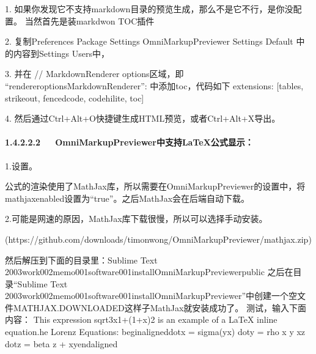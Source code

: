 \documentclass[letterpaper,12pt,english]{sphinxmanual}
\begin{document}
\begin{sphinxVerbatim}[commandchars=\\\{\}]
1. 如果你发现它不支持markdown目录的预览生成，那么不是它不行，是你没配置。
   当然首先是装markdwon TOC插件

2. 复制Preferences \PYGZhy{}\PYGZgt{} Package Settings \PYGZhy{}\PYGZgt{} OmniMarkupPreviewer \PYGZhy{}\PYGZgt{} Settings \PYGZhy{} Default 中的内容到Settings \PYGZhy{} Users中，

3. 并在 // MarkdownRenderer options区域，即
“renderer\PYGZus{}options\PYGZhy{}MarkdownRenderer”: 中添加\PYGZdq{}toc\PYGZdq{}，代码如下
        \PYGZdq{}extensions\PYGZdq{}: [\PYGZdq{}tables\PYGZdq{}, \PYGZdq{}strikeout\PYGZdq{}, \PYGZdq{}fenced\PYGZus{}code\PYGZdq{}, \PYGZdq{}codehilite\PYGZdq{}, \PYGZdq{}toc\PYGZdq{}]

4. 然后通过Ctrl+Alt+O快捷键生成HTML预览，或者Ctrl+Alt+X导出。
\end{sphinxVerbatim}


\paragraph{1.4.2.2.2   OmniMarkupPreviewer中支持LaTeX公式显示：}
\label{\detokenize{001software/001install/sublime:omnimarkuppreviewerlatex}}
1.设置。

\begin{sphinxVerbatim}[commandchars=\\\{\}]
公式的渲染使用了MathJax库，所以需要在OmniMarkupPreviewer的设置中，将\PYGZdq{}mathjax\PYGZus{}enabled\PYGZdq{}设置为“true”。之后MathJax会在后端自动下载。
\end{sphinxVerbatim}

2.可能是网速的原因，MathJax库下载很慢，所以可以选择手动安装。

\begin{sphinxVerbatim}[commandchars=\\\{\}]
[下载MathJax](https://github.com/downloads/timonwong/OmniMarkupPreviewer/mathjax.zip)

    然后解压到下面的目录里：Sublime Text 2\PYGZbs{}\PYGZbs{}003work\PYGZbs{}002memo\PYGZbs{}001software\PYGZbs{}001install\PYGZbs{}OmniMarkupPreviewer\PYGZbs{}public
    之后在目录“Sublime Text 2\PYGZbs{}\PYGZbs{}003work\PYGZbs{}002memo\PYGZbs{}001software\PYGZbs{}001install\PYGZbs{}OmniMarkupPreviewer”中创建一个空文件MATHJAX.DOWNLOADED这样子MathJax就安装成功了。
    测试，输入下面内容：
    This expression
    \PYGZdl{}\PYGZbs{}sqrt\PYGZob{}3x\PYGZhy{}1\PYGZcb{}+(1+x)\PYGZca{}2\PYGZdl{} is an example of a \PYGZdl{}\PYGZbs{}LaTeX\PYGZdl{} inline equation.he Lorenz Equations:
    \PYGZdl{}\PYGZdl{}\PYGZbs{}begin\PYGZob{}aligned\PYGZcb{}\PYGZbs{}dot\PYGZob{}x\PYGZcb{} \PYGZam{} = \PYGZbs{}sigma(y\PYGZhy{}x) \PYGZbs{}\PYGZbs{}\PYGZbs{}dot\PYGZob{}y\PYGZcb{} \PYGZam{} = \PYGZbs{}rho x \PYGZhy{} y \PYGZhy{} xz \PYGZbs{}\PYGZbs{}\PYGZbs{}dot\PYGZob{}z\PYGZcb{} \PYGZam{} = \PYGZhy{}\PYGZbs{}beta z + xy\PYGZbs{}end\PYGZob{}aligned\PYGZcb{}\PYGZdl{}\PYGZdl{}
\end{sphinxVerbatim}
\end{document}
